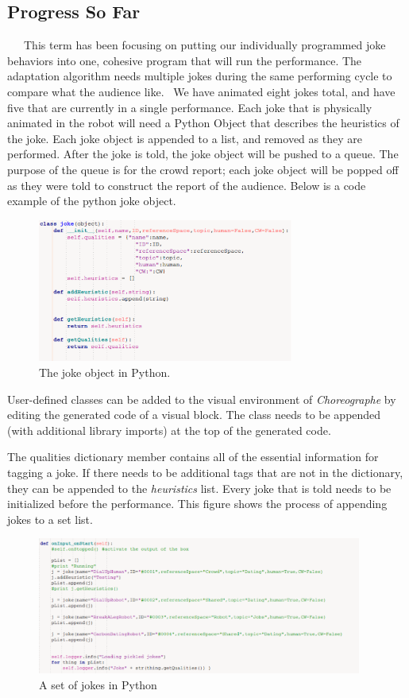 \documentclass[onecolumn, draftclsnofoot,10pt, compsoc]{IEEEtran}
\begin{document}
\subsection{Progress So Far}
   This term has been focusing on putting our individually programmed joke behaviors into one, cohesive program that will run the performance. The adaptation algorithm needs multiple jokes during the same performing cycle to compare what the audience like.  We have animated eight jokes total, and have five that are currently in a single performance. Each joke that is physically animated in the robot will need a Python Object that describes the heuristics of the joke. Each joke object is appended to a list, and removed as they are performed. After the joke is told, the joke object will be pushed to a queue. The purpose of the queue is for the crowd report; each joke object will be popped off as they were told to construct the report of the audience. Below is a code example of the python joke object.
\begin{figure}[H]
  \centering
  \includegraphics[width=0.75\textwidth,height=0.75\textheight,keepaspectratio]{class_joke}
  \caption{The joke object in Python.}
	\label{fig:class_joke}
\end{figure}

User-defined classes can be added to the visual environment of \textit{Choreographe} by editing the generated code of a visual block. The class needs to be appended (with additional library imports) at the top of the generated code.

The qualities dictionary member contains all of the essential information for tagging a joke. If there needs to be additional tags that are not in the dictionary, they can be appended to the \textit{heuristics} list. Every joke that is told needs to be initialized before the performance. This figure shows the process of appending jokes to a set list.
\begin{figure}[H]
  \centering
  \includegraphics[width=0.95\textwidth,height=0.95\textheight,keepaspectratio]{set_list}
  \caption{A set of jokes in Python}
	\label{fig:set_list}
\end{figure}
\end{document}
